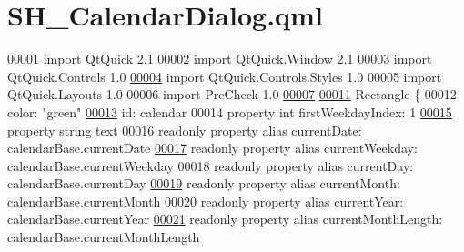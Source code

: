 \hypertarget{SH__CalendarDialog_8qml}{\section{S\-H\-\_\-\-Calendar\-Dialog.\-qml}
\label{SH__CalendarDialog_8qml}
}

\begin{DoxyCode}
00001 \textcolor{keyword}{import} QtQuick 2.1
00002 import QtQuick.Window 2.1
00003 import QtQuick.Controls 1.0
\hypertarget{SH__CalendarDialog_8qml_source_l00004}{}\hyperlink{classSH__CalendarDialog}{00004} import QtQuick.Controls.Styles 1.0
00005 import QtQuick.Layouts 1.0
00006 import PreCheck 1.0
\hypertarget{SH__CalendarDialog_8qml_source_l00007}{}\hyperlink{classSH__CalendarDialog_ada6f44b6f1a93ae9ef40b2fd3acdabd1}{00007} 
\hypertarget{SH__CalendarDialog_8qml_source_l00011}{}\hyperlink{classSH__CalendarDialog_a697b1e3c3faeee03197b575dd17cecdb}{00011} Rectangle \{
00012     color: \textcolor{stringliteral}{"green"}
\hypertarget{SH__CalendarDialog_8qml_source_l00013}{}\hyperlink{classSH__CalendarDialog_aa573e78a85228cbf2312b3bd7b776bbd}{00013}     \textcolor{keywordtype}{id}: calendar
00014     \textcolor{keyword}{property} \textcolor{keywordtype}{int} firstWeekdayIndex: 1
\hypertarget{SH__CalendarDialog_8qml_source_l00015}{}\hyperlink{classSH__CalendarDialog_a2c0ae47d55757e17551d5d6ea5413bb9}{00015}     \textcolor{keyword}{property} \textcolor{keywordtype}{string} text
00016     readonly \textcolor{keyword}{property} alias currentDate: calendarBase.currentDate
\hypertarget{SH__CalendarDialog_8qml_source_l00017}{}\hyperlink{classSH__CalendarDialog_a297eca7b6afa21350ff89a43580ff406}{00017}     readonly \textcolor{keyword}{property} alias currentWeekday: calendarBase.currentWeekday
00018     readonly \textcolor{keyword}{property} alias currentDay: calendarBase.currentDay
\hypertarget{SH__CalendarDialog_8qml_source_l00019}{}\hyperlink{classSH__CalendarDialog_a98760601bdd0a916ee33f4ed7ff185aa}{00019}     readonly \textcolor{keyword}{property} alias currentMonth: calendarBase.currentMonth
00020     readonly \textcolor{keyword}{property} alias currentYear: calendarBase.currentYear
\hypertarget{SH__CalendarDialog_8qml_source_l00021}{}\hyperlink{classSH__CalendarDialog_a9708f1f6b6cdcf136c533e206a29d98e}{00021}     readonly \textcolor{keyword}{property} alias currentMonthLength: calendarBase.currentMonthLength

\end{DoxyCode}
